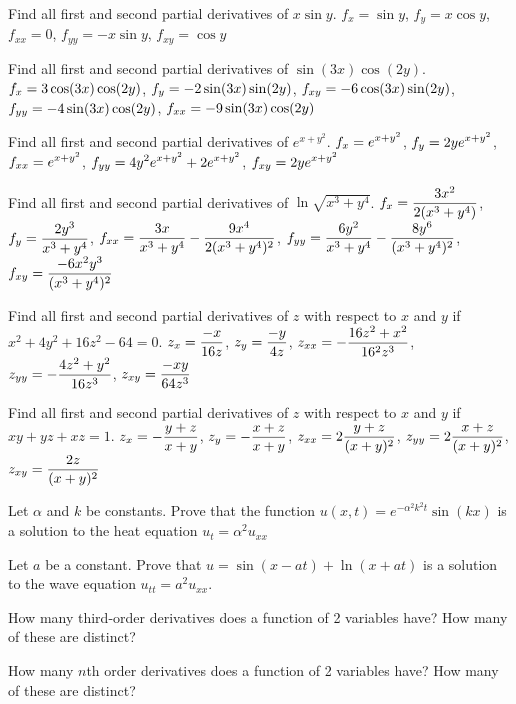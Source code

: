\exercise Find all first and second partial derivatives of
$x\sin y$.
\answer $f_x=\sin y$, $f_y=x\cos y$, $f_{xx}=0$, $f_{yy}=-x\sin y$,
$f_{xy}=\cos y$
\endanswer
\endexercise

\exercise Find all first and second partial derivatives of
$\sin(3x)\cos(2y)$.
\answer $\displaystyle f_x=3\cos(3x)\cos(2y)$,\hfill\break 
$\displaystyle f_y=-2\sin(3x)\sin(2y)$,\hfill\break 
$\displaystyle f_{xy}=-6\cos(3x)\sin(2y)$,\hfill\break 
$\displaystyle f_{yy}=-4\sin(3x)\cos(2y)$,\hfill\break 
$\displaystyle f_{xx}=-9\sin(3x)\cos(2y)$
\endanswer
\endexercise

\exercise Find all first and second partial derivatives of
$e^{x+y^2}$.
\answer $\displaystyle f_x=e^{x+y^2}$, $\displaystyle f_y=2ye^{x+y^2}$,\hfill\break 
$\displaystyle f_{xx}=e^{x+y^2}$,\hfill\break 
$\displaystyle f_{yy}=4y^2e^{x+y^2}+2e^{x+y^2}$,\hfill\break 
$\displaystyle f_{xy}=2ye^{x+y^2}$
\endanswer
\endexercise

\exercise Find all first and second partial derivatives of
$\ln\sqrt{x^3+y^4}$.
\answer $\displaystyle f_x={3x^2\over2(x^3+y^4)}$, 
$\displaystyle f_y={2y^3\over x^3+y^4}$,
$\displaystyle f_{xx}={3x\over x^3+y^4}-{9x^4\over 2(x^3+y^4)^2}$, 
$\displaystyle f_{yy}={6y^2\over x^3+y^4}-{8y^6\over (x^3+y^4)^2}$,\hfill\break 
$\displaystyle f_{xy}={-6x^2y^3\over (x^3+y^4)^2}$
\endanswer
\endexercise

\exercise Find all first and second partial derivatives of
$z$ with respect to $x$ and $y$ if 
$x^2+4y^2+16z^2-64=0$.
\answer $\displaystyle z_x={-x\over16z}$, 
$\displaystyle z_y={-y\over4z}$,\hfill\break 
$\displaystyle z_{xx}=-{16z^2+x^2\over16^2z^3}$,\hfill\break 
$\displaystyle z_{yy}=-{4z^2+y^2\over16z^3}$,\hfill\break 
$\displaystyle z_{xy}={-xy\over64z^3}$
\endanswer
\endexercise

\exercise Find all first and second partial derivatives of
$z$ with respect to $x$ and $y$ if 
$xy+yz+xz=1$.
\answer $\displaystyle z_x=-{y+z\over x+y}$, 
$\displaystyle z_y=-{x+z\over x+y}$,\hfill\break 
$\displaystyle z_{xx}=2{y+z\over(x+y)^2}$, 
$\displaystyle z_{yy}=2{x+z\over(x+y)^2}$,\hfill\break 
$\displaystyle z_{xy}={2z\over(x+y)^2}$
\endanswer
\endexercise

\exercise Let $\alpha$ and $k$ be constants.  Prove that the function 
$u(x,t)=e^{-\alpha^2k^2t}\sin(kx)$
is a solution to the heat equation $u_t=\alpha^2u_{xx}$
\endexercise

\exercise Let $a$ be a constant.  Prove that $u=\sin(x-at)+\ln(x+at)$ is
  a solution to the wave equation $u_{tt}=a^2u_{xx}$.

\endexercise

\exercise How many third-order derivatives does a function of 2 variables
  have?  How many of these are distinct?
\endexercise

\exercise How many $n$th order derivatives does a function of 2 variables
  have?  How many of these are distinct?
\endexercise

\endexercises

